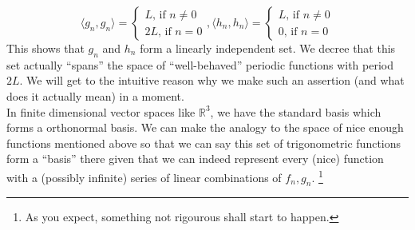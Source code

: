 $$\langle g_n,g_n\rangle=\begin{cases}
    L\text{, if $n\neq 0$}\\
    2L\text{, if $n=0$}
\end{cases},\langle h_n,h_n\rangle=\begin{cases}
    L\text{, if $n\neq 0$}\\
    0\text{, if $n=0$}
\end{cases}$$
This shows that $g_n$ and $h_n$ form a linearly independent set.
We decree that this set actually ``spans'' the space of ``well-behaved'' periodic functions with period $2L$.
We will get to the intuitive reason why we make such an assertion (and what does it actually mean) in a moment.\\
In finite dimensional vector spaces like $\mathbb R^3$, we have the standard basis which forms a orthonormal basis.
We can make the analogy to the space of nice enough functions mentioned above so that we can say this set of trigonometric functions form a ``basis'' there given that we can indeed represent every (nice) function with a (possibly infinite) series of linear combinations of $f_n,g_n$.
\footnote{As you expect, something not rigourous shall start to happen.}
